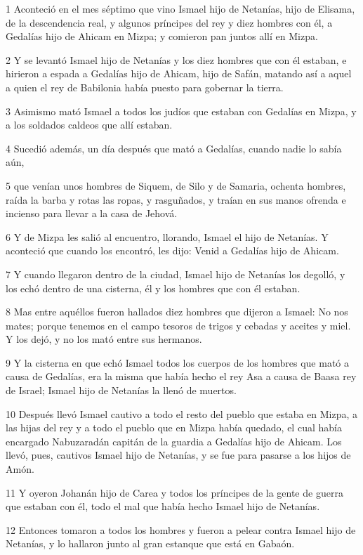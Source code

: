 \par 1 Aconteció en el mes séptimo que vino Ismael hijo de Netanías, hijo de Elisama, de la descendencia real, y algunos príncipes del rey y diez hombres con él, a Gedalías hijo de Ahicam en Mizpa; y comieron pan juntos allí en Mizpa.
\par 2 Y se levantó Ismael hijo de Netanías y los diez hombres que con él estaban, e hirieron a espada a Gedalías hijo de Ahicam, hijo de Safán, matando así a aquel a quien el rey de Babilonia había puesto para gobernar la tierra.
\par 3 Asimismo mató Ismael a todos los judíos que estaban con Gedalías en Mizpa, y a los soldados caldeos que allí estaban. 
\par 4 Sucedió además, un día después que mató a Gedalías, cuando nadie lo sabía aún,
\par 5 que venían unos hombres de Siquem, de Silo y de Samaria, ochenta hombres, raída la barba y rotas las ropas, y rasguñados, y traían en sus manos ofrenda e incienso para llevar a la casa de Jehová.
\par 6 Y de Mizpa les salió al encuentro, llorando, Ismael el hijo de Netanías. Y aconteció que cuando los encontró, les dijo: Venid a Gedalías hijo de Ahicam.
\par 7 Y cuando llegaron dentro de la ciudad, Ismael hijo de Netanías los degolló, y los echó dentro de una cisterna, él y los hombres que con él estaban.
\par 8 Mas entre aquéllos fueron hallados diez hombres que dijeron a Ismael: No nos mates; porque tenemos en el campo tesoros de trigos y cebadas y aceites y miel. Y los dejó, y no los mató entre sus hermanos.
\par 9 Y la cisterna en que echó Ismael todos los cuerpos de los hombres que mató a causa de Gedalías, era la misma que había hecho el rey Asa a causa de Baasa rey de Israel; Ismael hijo de Netanías la llenó de muertos.
\par 10 Después llevó Ismael cautivo a todo el resto del pueblo que estaba en Mizpa, a las hijas del rey y a todo el pueblo que en Mizpa había quedado, el cual había encargado Nabuzaradán capitán de la guardia a Gedalías hijo de Ahicam. Los llevó, pues, cautivos Ismael hijo de Netanías, y se fue para pasarse a los hijos de Amón.
\par 11 Y oyeron Johanán hijo de Carea y todos los príncipes de la gente de guerra que estaban con él, todo el mal que había hecho Ismael hijo de Netanías.
\par 12 Entonces tomaron a todos los hombres y fueron a pelear contra Ismael hijo de Netanías, y lo hallaron junto al gran estanque que está en Gabaón.
